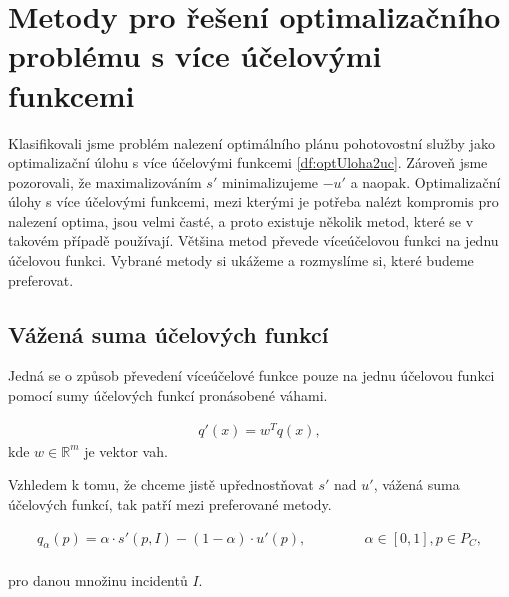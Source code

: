 \section{Metody pro řešení optimalizačního problému s více účelovými funkcemi}\label{kap:metodyProReseniOptSViceUcel}

Klasifikovali jsme problém nalezení optimálního plánu pohotovostní služby jako optimalizační úlohu s více účelovými funkcemi \ref{df:optUloha2uc}.
Zároveň jsme pozorovali, že maximalizováním $s'$ minimalizujeme $-u'$ a naopak.
Optimalizační úlohy s více účelovými funkcemi, mezi kterými je potřeba nalézt kompromis pro nalezení optima, jsou velmi časté,
a proto existuje několik metod, které se v takovém případě používají.
Většina metod převede víceúčelovou funkci na jednu účelovou funkci.
Vybrané metody si ukážeme a rozmyslíme si, které budeme preferovat. 

\subsection{Vážená suma účelových funkcí}\label{kap:vazenaSumaUcelF}

Jedná se o způsob převedení víceúčelové funkce pouze na jednu účelovou funkci pomocí sumy účelových funkcí pronásobené váhami.

\begin{definice}
  \begin{align*}
    q'(x) = w^T q(x),
  \end{align*}
  kde $w \in \mathbb{R}^m$ je vektor vah.
  \\
\end{definice}

Vzhledem k tomu, že chceme jistě upřednostňovat $s'$ nad $u'$, vážená suma účelových funkcí, tak patří mezi preferované metody.

\begin{definice}\label{df:vazenaSumaPohotovost}
  \begin{align*}
    q_{\alpha}(p) = \alpha \cdot s'(p, I) - (1 - \alpha) \cdot u'(p), \hspace{50pt} \alpha \in [0, 1], p \in P_C,
  \end{align*}
  \\
  pro danou množinu incidentů $I$.
  \\
\end{definice}

